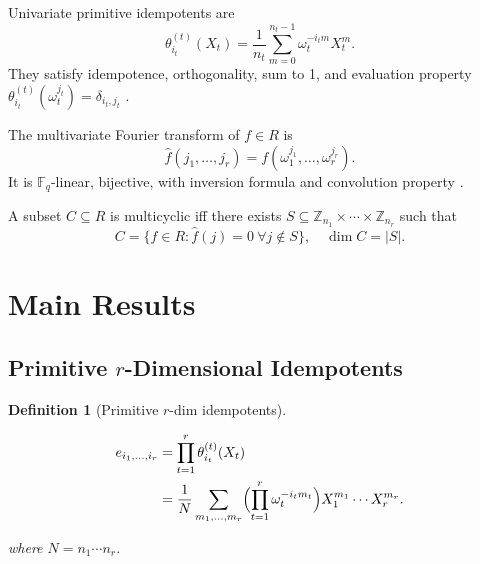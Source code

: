 \documentclass[10pt,twocolumn]{IEEEtran}
\theoremstyle{plain}
\newtheorem{defi}[thm]{Definition}
\theoremstyle{definition}
\newcommand{\Fq}{\mathbb{F}_q}
\newcommand{\Zn}[1]{\mathbb{Z}_{#1}}
\begin{document}
Univariate primitive idempotents are
\[
\theta_{i_t}^{(t)}(X_t) = \frac{1}{n_t} \sum_{m=0}^{n_t-1} \omega_t^{-i_t m} X_t^m.
\]
They satisfy idempotence, orthogonality, sum to 1, and evaluation property $\theta_{i_t}^{(t)}(\omega_t^{j_t}) = \delta_{i_t,j_t}$ \cite{macwilliams1977, blahut2003}.

The multivariate Fourier transform of $f\in R$ is
\[
\hat{f}(j_1,\dots,j_r) = f(\omega_1^{j_1},\dots,\omega_r^{j_r}).
\]
It is $\Fq$-linear, bijective, with inversion formula and convolution property \cite{blahut2003}.

A subset $C\subseteq R$ is multicyclic iff there exists $S\subseteq \Zn{n_1}\times\cdots\times\Zn{n_r}$ such that
\[
C = \{f\in R : \hat{f}(j)=0 \ \forall j\notin S\}, \quad \dim C = |S|.
\]

\section{Main Results}
\subsection{Primitive $r$-Dimensional Idempotents}
\begin{defi}[Primitive $r$-dim idempotents]\label{def:idemp-rdim}

\begin{align}
\begin{split}
e_{i_1,\dots,i_r} 
&= \prod_{t=1}^r \theta_{i_t}^{(t)}(X_t) \\
&= \frac{1}{N}\sum_{m_1,\dots,m_r}
   \Bigl(\prod_{t=1}^r \omega_t^{-i_t m_t}\Bigr)
   X_1^{m_1}\cdots X_r^{m_r}.
\end{split}
\end{align}

where $N = n_1\cdots n_r$.
\end{defi}
\end{document}
